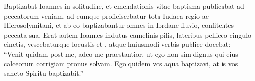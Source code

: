 \documentclass{article}
\newcommand{\bv}[1]{\linenumannotation{#1}}
\begin{document}
  \beginnumbering
  \pstart
    \bv{4}Baptizabat Ioannes in solitudine, et emendationis vitae baptisma publicabat ad peccatorum veniam,\bv{5} ad eumque proficiscebatur tota Iudaea regio ac Hierosolymitani, et ab eo baptizabantur omnes in Iordane fluvio, confitentes peccata sua.\bv{6} Erat autem Ioannes indutus camelinis pilis, lateribus pelliceo cingulo cinctis, vescebaturque locustis et ,\bv{7} atque huiusmodi verbis publice docebat: “Venit quidam post me, adeo me praestantior, ut ego non sim dignus qui eius calceorum corrigiam pronus solvam.\bv{8} Ego quidem vos aqua baptizavi, at is vos sancto Spiritu baptizabit.”
  \pend
  \endnumbering
\end{document}
